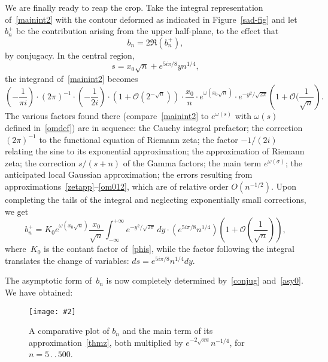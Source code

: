 \documentclass{amsart}
\newcommand{\Img}[2]{\texttt{[image: \#2]}}
\begin{document}
We are finally ready to reap the crop. Take the integral representation
of~\eqref{mainint2} with the contour deformed as indicated in Figure~\ref{sad-fig} and
let $b_n^{+}$ be the contribution arising from the upper half-plane, to
the effect that
\begin{equation}\label{conjug}
b_n=2\Re(b_n^+),
\end{equation}
by conjugacy. In the central region, 
\[
s=x_0\sqrt{n}+e^{5i\pi/8}yn^{1/4},
\]
the integrand of~\eqref{mainint2} becomes
\begin{equation}\label{phis}
\left(-\frac{1}{\pi i}\right)\cdot 
(2\pi)^{-1}\cdot 
\left(-\frac{1}{2i}\right)\cdot
 \left(1+\mathcal{O}(2^{-\sqrt{n}})\right)\cdot 
\frac{x_0}{n} \cdot e^{\omega(x_0\sqrt{n})} \cdot
e^{-y^2/\sqrt{2\pi}}\left(1+\mathcal{O}(\frac{1}{\sqrt{n}}\right).
\end{equation}
The various factors found there (compare~\eqref{mainint2} to $e^{\omega(s)}$
with $\omega(s)$ defined in~\eqref{omdef})
are in sequence: the Cauchy integral prefactor; 
the correction $(2\pi)^{-1}$ to the functional equation of Riemann zeta;
the factor $-1/(2i)$ relating the sine to its
exponential approximation; the approximation of Riemann zeta;
the correction $s/(s+n)$ of the Gamma factors; 
the main term $e^{\omega(\sigma)}$;
the anticipated local Gaussian approximation;
the errors resulting from approximations~\eqref{zetapp}--\eqref{om012},
which are of relative order $O(n^{-1/2})$. Upon completing the tails of the 
integral and neglecting exponentially small corrections,
we get
\begin{equation}\label{asy0}
b_n^+ =K_0 e^{\omega(x_0\sqrt{n})}
\frac{x_0}{\sqrt{n}}
\int_{-\infty}^{+\infty} e^{-y^2/\sqrt{2\pi}}\,dy
\cdot\left(e^{5i\pi/8}n^{1/4}\right)\left(1+\mathcal{O}\left(\frac{1}{\sqrt{n}}\right)\right),
\end{equation}
where~$K_0$    is the contant  factor  of~\eqref{phis}, while the factor
following   the integral   translates the   change   of   variables:
$ds=e^{5i\pi/8}n^{1/4}dy$. 

The  asymptotic form of~$b_n$ is now completely
determined by~\eqref{conjug} and~\eqref{asy0}.
We have obtained:

\begin{figure}
\begin{center}
\Img{7}{comparapp.jpg}
\end{center}
\caption{\label{comparapp-fig} A comparative plot of $b_n$ and 
the main term of its approximation~\eqref{thmz},
both multiplied by $e^{-2\sqrt{\pi n}}n^{-1/4}$, for $n=5\,.\,.\,500$.}
\end{figure}
\end{document}
